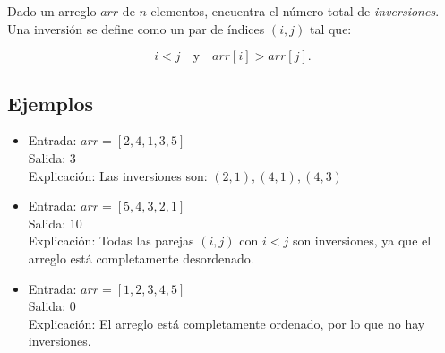 Dado un arreglo \( arr \) de \( n \) elementos, encuentra el número total de \textit{inversiones}. Una inversión se define como un par de índices \( (i, j) \) tal que:

\[
i < j \quad \text{y} \quad arr[i] > arr[j].
\]

\subsection*{Ejemplos}
\begin{itemize}
    \item Entrada: \( arr = [2, 4, 1, 3, 5] \) \\
     Salida: \( 3 \)\\
     Explicación:  Las inversiones son:
    \(
    (2, 1), (4, 1), (4, 3)
    \)

    \item Entrada: \( arr = [5, 4, 3, 2, 1] \) \\
    Salida: \( 10 \)\\
    Explicación:  Todas las parejas \( (i, j) \) con \( i < j \) son inversiones, ya que el arreglo está completamente desordenado.

    \item Entrada: \( arr = [1, 2, 3, 4, 5] \) \\
    Salida: \( 0 \)\\
    Explicación:  El arreglo está completamente ordenado, por lo que no hay inversiones.
\end{itemize}
